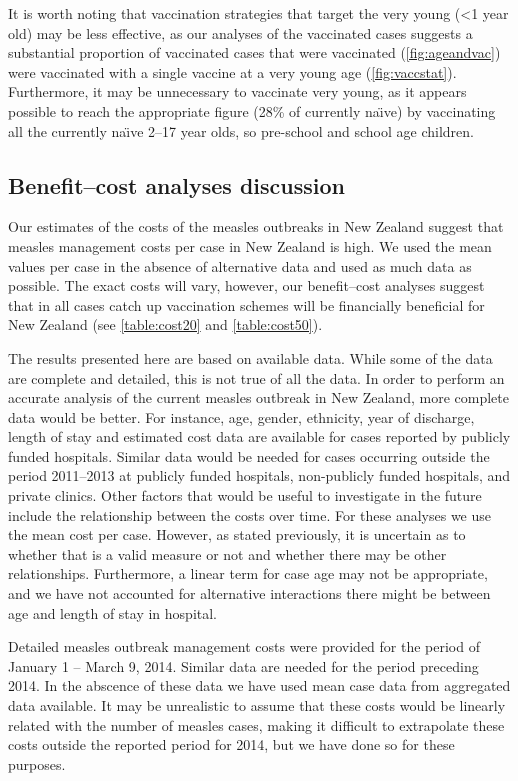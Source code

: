 \documentclass{article}
\begin{document}
It is worth noting that vaccination strategies that target the very young (<1 year old) may be less effective, as our analyses of the vaccinated cases suggests a substantial proportion of vaccinated cases that were vaccinated (\autoref{fig:ageandvac}) were vaccinated with a single vaccine at a very young age (\autoref{fig:vaccstat}). Furthermore, it may be unnecessary to vaccinate very young, as it appears possible to reach the appropriate figure (28\% of currently na\"{\i}ve) by vaccinating all the currently na\"{\i}ve 2--17 year olds, so pre-school and school age children.

\subsection{Benefit--cost analyses discussion}

Our estimates of the costs of the measles outbreaks in New Zealand suggest that measles management costs per case in New Zealand is high. We used the mean values per case in the absence of alternative data and used as much data as possible. The exact costs will vary, however, our benefit--cost analyses suggest that in all cases catch up vaccination schemes will be financially beneficial for New Zealand (see \autoref{table:cost20} and \autoref{table:cost50}).

The results presented here are based on available data. While some of the data are complete and detailed, this is not true of all the data. In order to perform an accurate analysis of the current measles outbreak in New Zealand, more complete data would be better. For instance, age, gender, ethnicity, year of discharge, length of stay and estimated cost data are available for cases reported by publicly funded hospitals. Similar data would be needed for cases occurring outside the period 2011--2013 at publicly funded hospitals, non-publicly funded hospitals, and private clinics. Other factors that would be useful to investigate in the future include the relationship between the costs over time. For these analyses we use the mean cost per case. However, as stated previously, it is uncertain as to whether that is a valid measure or not and whether there may be other relationships. Furthermore, a linear term for case age may not be appropriate, and we have not accounted for alternative interactions there might be between age and length of stay in hospital.

Detailed measles outbreak management costs were provided for the period of January 1 -- March 9, 2014. Similar data are needed for the period preceding 2014. In the abscence of these data we have used mean case data from aggregated data available. It may be unrealistic to assume that these costs would be linearly related with the number of measles cases, making it difficult to extrapolate these costs outside the reported period for 2014, but we have done so for these purposes.
\end{document}
